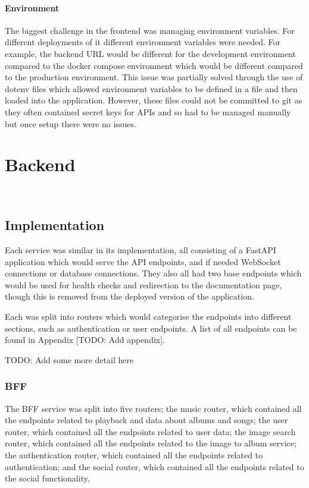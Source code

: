 \paragraph{Environment}
The biggest challenge in the frontend was managing environment variables. For different deployments of it different environment variables were needed. For example, the backend URL would be different for the development environment compared to the docker compose environment which would be different compared to the production environment. This issue was partially solved through the use of dotenv files which allowed environment variables to be defined in a file and then loaded into the application. However, these files could not be committed to git as they often contained secret keys for APIs and so had to be managed manually but once setup there were no issues.

\section{Backend}~\label{sec:backend-development}
\subsection{Implementation}
Each service was similar in its implementation, all consisting of a FastAPI application which would serve the API endpoints, and if needed WebSocket connections or database connections. They also all had two base endpoints which would be used for health checks and redirection to the documentation page, though this is removed from the deployed version of the application.

Each was split into routers which would categorise the endpoints into different sections, such as authentication or user endpoints. A list of all endpoints can be found in Appendix [TODO: Add appendix].

TODO: Add some more detail here

\subsubsection{BFF}
The BFF service was split into five routers; the music router, which contained all the endpoints related to playback and data about albums and songs; the user router, which contained all the endpoints related to user data; the image search router, which contained all the endpoints related to the image to album service; the authentication router, which contained all the endpoints related to authentication; and the social router, which contained all the endpoints related to the social functionality.

